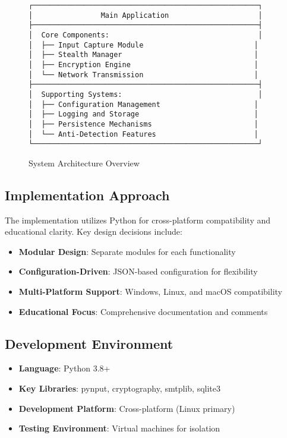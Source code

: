 \documentclass[12pt,a4paper]{article}
\begin{document}
\begin{figure}[H]
\centering
\begin{verbatim}
┌─────────────────────────────────────────────────────┐
│                Main Application                     │
├─────────────────────────────────────────────────────┤
│  Core Components:                                   │
│  ├── Input Capture Module                          │
│  ├── Stealth Manager                               │
│  ├── Encryption Engine                             │
│  └── Network Transmission                          │
├─────────────────────────────────────────────────────┤
│  Supporting Systems:                                │
│  ├── Configuration Management                      │
│  ├── Logging and Storage                           │
│  ├── Persistence Mechanisms                        │
│  └── Anti-Detection Features                       │
└─────────────────────────────────────────────────────┘
\end{verbatim}
\caption{System Architecture Overview}
\label{fig:architecture}
\end{figure}

\subsection{Implementation Approach}

The implementation utilizes Python for cross-platform compatibility and educational clarity. Key design decisions include:

\begin{itemize}
    \item \textbf{Modular Design}: Separate modules for each functionality
    \item \textbf{Configuration-Driven}: JSON-based configuration for flexibility
    \item \textbf{Multi-Platform Support}: Windows, Linux, and macOS compatibility
    \item \textbf{Educational Focus}: Comprehensive documentation and comments
\end{itemize}

\subsection{Development Environment}

\begin{itemize}
    \item \textbf{Language}: Python 3.8+
    \item \textbf{Key Libraries}: pynput, cryptography, smtplib, sqlite3
    \item \textbf{Development Platform}: Cross-platform (Linux primary)
    \item \textbf{Testing Environment}: Virtual machines for isolation
\end{itemize}
\end{document}
